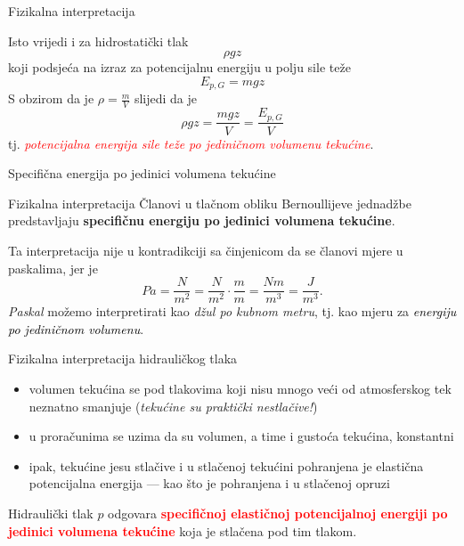 \documentclass[croatian]{beamer}
\begin{document}
\begin{frame}{Fizikalna interpretacija}

Isto vrijedi i za hidrostatički tlak
\[
\rho gz
\]
koji podsjeća na izraz za potencijalnu energiju u polju sile teže
\[
E_{p,G}=mgz
\]
S obzirom da je $\rho=\frac{m}{V}$ slijedi da je
\[
\rho gz=\frac{mgz}{V}=\frac{E_{p,G}}{V}
\]
tj. \textcolor{red}{\emph{potencijalna energija sile teže po jediničnom
volumenu tekućine}}.

\end{frame}

\begin{frame}{Specifična energija po jedinici volumena tekućine}

\begin{alertblock}{Fizikalna interpretacija}
 Članovi u tlačnom obliku Bernoullijeve jednadžbe predstavljaju \textbf{specifičnu
energiju po jedinici volumena tekućine}.
\end{alertblock}

Ta interpretacija nije u kontradikciji sa činjenicom da se članovi
mjere u paskalima, jer je
\[
Pa=\frac{N}{m^{2}}=\frac{N}{m^{2}}\cdot\frac{m}{m}=\frac{Nm}{m^{3}}=\frac{J}{m^{3}}.
\]
\emph{Paskal} možemo interpretirati kao \emph{džul po kubnom metru},
tj. kao mjeru za \textcolor{black}{\emph{energiju po jediničnom volumenu}}.
\end{frame}

\begin{frame}{Fizikalna interpretacija hidrauličkog tlaka}

\begin{itemize}
\item volumen tekućina se pod tlakovima koji nisu mnogo veći od atmosferskog
tek neznatno smanjuje (\emph{tekućine su praktički nestlačive!})
\item u proračunima se uzima da su volumen, a time i gustoća tekućina, konstantni
\item ipak, tekućine jesu stlačive i u stlačenoj tekućini pohranjena je
elastična potencijalna energija --- kao što je pohranjena i u stlačenoj
opruzi
\end{itemize}

\begin{block}{}
Hidraulički tlak $p$ odgovara \textbf{\textcolor{red}{specifičnoj
elastičnoj potencijalnoj energiji po jedinici volumena tekućine}}
koja je stlačena pod tim tlakom.
\end{block}
\end{frame}
\end{document}
